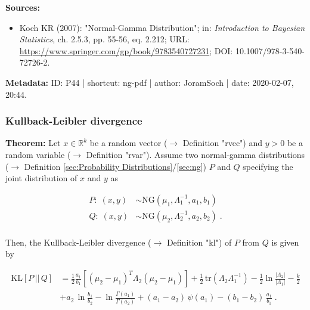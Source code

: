 \documentclass[a4paper,12pt]{book}
\begin{document}
\vspace{1em}
\textbf{Sources:}
\begin{itemize}
\item Koch KR (2007): "Normal-Gamma Distribution"; in: \textit{Introduction to Bayesian Statistics}, ch. 2.5.3, pp. 55-56, eq. 2.212; URL: \url{https://www.springer.com/gp/book/9783540727231}; DOI: 10.1007/978-3-540-72726-2.
\end{itemize}


\vspace{1em}
\textbf{Metadata:} ID: P44 | shortcut: ng-pdf | author: JoramSoch | date: 2020-02-07, 20:44.


\subsubsection[\textbf{Kullback-Leibler divergence}]{Kullback-Leibler divergence} \label{sec:ng-kl}

\vspace{1em}
\textbf{Theorem:} Let $x \in \mathbb{R}^k$ be a random vector ($\rightarrow$ Definition "rvec") and $y > 0$ be a random variable ($\rightarrow$ Definition "rvar"). Assume two normal-gamma distributions ($\rightarrow$ Definition \ref{sec:Probability Distributions}/\ref{sec:ng}) $P$ and $Q$ specifying the joint distribution of $x$ and $y$ as

\begin{equation} \label{eq:ng-kl-NGs}
\begin{split}
P: \; (x,y) &\sim \mathrm{NG}(\mu_1, \Lambda_1^{-1}, a_1, b_1) \\
Q: \; (x,y) &\sim \mathrm{NG}(\mu_2, \Lambda_2^{-1}, a_2, b_2) \; . \\
\end{split}
\end{equation}

Then, the Kullback-Leibler divergence ($\rightarrow$ Definition "kl") of $P$ from $Q$ is given by

\begin{equation} \label{eq:ng-kl-NG-KL}
\begin{split}
\mathrm{KL}[P\,||\,Q] &= \frac{1}{2} \frac{a_1}{b_1} \left[ (\mu_2 - \mu_1)^T \Lambda_2 (\mu_2 - \mu_1) \right] + \frac{1}{2} \, \mathrm{tr}(\Lambda_2 \Lambda_1^{-1}) - \frac{1}{2} \ln \frac{|\Lambda_2|}{|\Lambda_1|} - \frac{k}{2} \\
&+ a_2 \, \ln \frac{b_1}{b_2} - \ln \frac{\Gamma(a_1)}{\Gamma(a_2)} + (a_1 - a_2) \, \psi(a_1) - (b_1 - b_2) \, \frac{a_1}{b_1} \; .
\end{split}
\end{equation}
\end{document}
